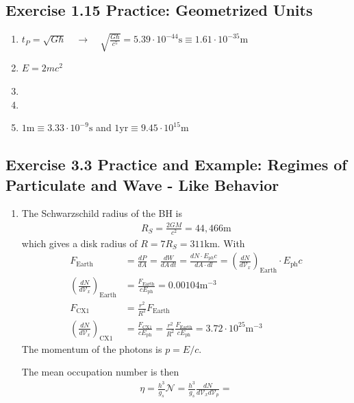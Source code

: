 \documentclass[10pt,a4paper]{book}
\theoremstyle{definition}
\begin{document}
\subsection{Exercise 1.15 Practice: Geometrized Units}
\begin{enumerate}[label=(\alph*)]
\item $t_P=\sqrt{G\hbar}\quad\rightarrow\quad\sqrt{\frac{G\hbar}{c^5}}= 5.39\cdot10^{-44}\text{s}\equiv 1.61\cdot10^{-35}\text{m}$
\item $E=2mc^2$
\item 
\item 
\item $1\text{m}\equiv 3.33\cdot10^{-9}\text{s}$ and $1\text{yr}\equiv 9.45\cdot10^{15}\text{m}$
\end{enumerate}


\subsection{Exercise 3.3 Practice and Example: Regimes of Particulate and Wave - Like Behavior}
\begin{enumerate}[label=(\alph*)]
\item The Schwarzschild radius of the BH is
\begin{align}
    R_S=\frac{2GM}{c^2}=44,466\text{m}
\end{align}
which gives a disk radius of $R=7R_S=311\text{km}$.
With
\begin{align}
    F_\text{Earth}&=\frac{dP}{dA}=\frac{dW}{dA\,dt}=\frac{dN\cdot E_{ph} c}{dA\cdot
    dl}=\left(\frac{dN}{d\mathcal{V}_x}\right)_\text{Earth}\cdot E_\text{ph} c\\
    \left(\frac{dN}{d\mathcal{V}_x}\right)_\text{Earth}&=\frac{F_\text{Earth}}{cE_\text{ph}}=0.00104\text{m}^{-3}\\
    F_\text{CX1}&=\frac{r^2}{R^2}F_\text{Earth}\\
    \left(\frac{dN}{d\mathcal{V}_x}\right)_\text{CX1}&=\frac{F_\text{CX1}}{cE_\text{ph}}=\frac{r^2}{R^2}\frac{F_\text{Earth}}{cE_\text{ph}}=3.72\cdot10^{25}\text{m}^{-3}
\end{align}
The momentum of the photons is $p=E/c$.

The mean occupation number is then
\begin{align}
    \eta=\frac{h^3}{g_s}\mathcal{N}=\frac{h^3}{g_s}\frac{dN}{d\mathcal{V}_xd\mathcal{V}_p}=
\end{align}
\end{enumerate}
\end{document}

